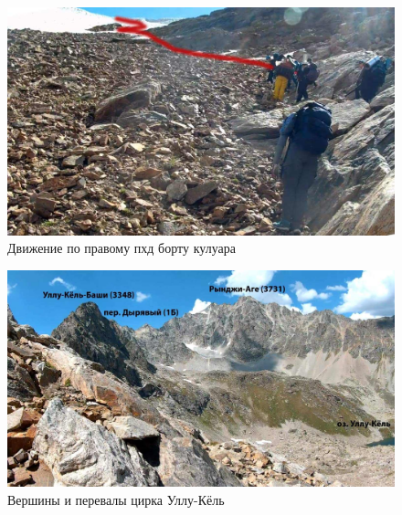 \begin{figure}[h!]
	\centering
	\includegraphics[width=0.7\linewidth]{../pics/20aug3.jpg}
	\caption{Движение по правому пхд борту кулуара}
	\label{fig:20aug3.jpg}
\end{figure}
\begin{figure}[h!]
	\centering
	\includegraphics[width=0.7\linewidth]{../pics/20aug4.jpg}
	\caption{Вершины и перевалы цирка Уллу-Кёль}
	\label{fig:20aug4.jpg}
\end{figure}

